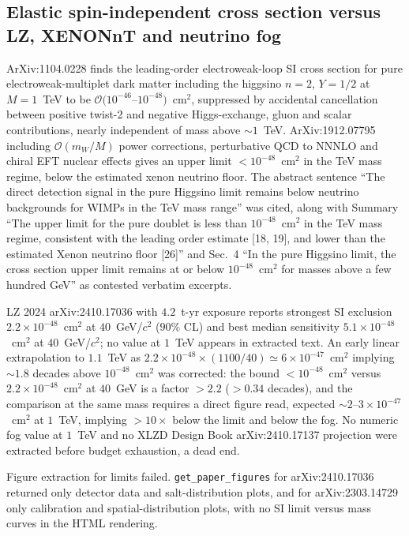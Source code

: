 \documentclass[11pt,a4paper]{article}
\begin{document}
\subsection{Elastic spin-independent cross section versus LZ, XENONnT and neutrino fog}
ArXiv:1104.0228 finds the leading-order electroweak-loop SI cross section for pure electroweak-multiplet dark matter including the higgsino $n=2$, $Y=1/2$ at $M=1$~TeV to be $\mathcal{O}(10^{-46}$--$10^{-48})$~cm$^{2}$, suppressed by accidental cancellation between positive twist-2 and negative Higgs-exchange, gluon and scalar contributions, nearly independent of mass above $\sim1$~TeV. ArXiv:1912.07795 including $\mathcal{O}(m_{W}/M)$ power corrections, perturbative QCD to NNNLO and chiral EFT nuclear effects gives an upper limit $<10^{-48}$~cm$^{2}$ in the TeV mass regime, below the estimated xenon neutrino floor. The abstract sentence ``The direct detection signal in the pure Higgsino limit remains below neutrino backgrounds for WIMPs in the TeV mass range'' was cited, along with Summary ``The upper limit for the pure doublet is less than $10^{-48}$~cm$^{2}$ in the TeV mass regime, consistent with the leading order estimate [18, 19], and lower than the estimated Xenon neutrino floor [26]'' and Sec.~4 ``In the pure Higgsino limit, the cross section upper limit remains at or below $10^{-48}$~cm$^{2}$ for masses above a few hundred GeV'' as contested verbatim excerpts.

LZ 2024 arXiv:2410.17036 with $4.2$~t-yr exposure reports strongest SI exclusion $2.2\times10^{-48}$~cm$^{2}$ at $40$~GeV/$c^{2}$ ($90\%$ CL) and best median sensitivity $5.1\times10^{-48}$~cm$^{2}$ at $40$~GeV/$c^{2}$; no value at $1$~TeV appears in extracted text. An early linear extrapolation to $1.1$~TeV as $2.2\times10^{-48}\times(1100/40)\simeq6\times10^{-47}$~cm$^{2}$ implying $\sim1.8$ decades above $10^{-48}$~cm$^{2}$ was corrected: the bound $<10^{-48}$~cm$^{2}$ versus $2.2\times10^{-48}$~cm$^{2}$ at $40$~GeV is a factor $>2.2$ ($>0.34$ decades), and the comparison at the same mass requires a direct figure read, expected $\sim2$--$3\times10^{-47}$~cm$^{2}$ at $1$~TeV, implying $>10\times$ below the limit and below the fog. No numeric fog value at $1$~TeV and no XLZD Design Book arXiv:2410.17137 projection were extracted before budget exhaustion, a dead end.

Figure extraction for limits failed. \texttt{get\_paper\_figures} for arXiv:2410.17036 returned only detector data and salt-distribution plots, and for arXiv:2303.14729 only calibration and spatial-distribution plots, with no SI limit versus mass curves in the HTML rendering.
\end{document}
